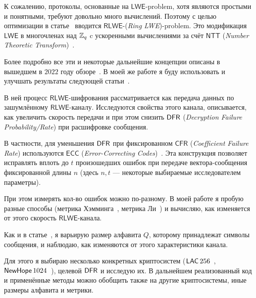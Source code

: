 К сожалению, протоколы, основанные на $\mathsf{LWE}$-problem, хотя являются простыми и понятными, требуют довольно много вычислений. Поэтому с целью оптимизации в статье~\cite{RLWE} вводится $\mathsf{RLWE}$-({\it Ring LWE})-problem. Это модификация $\mathsf{LWE}$ в многочленах над $\mathbb{Z}_q$ c ускоренными вычислениями за счёт $\mathsf{NTT}$ ({\it Number Theoretic Transform})~\cite{NTT_applications}.

Более подробно все эти и некоторые дальнейшие концепции описаны в вышедшем в $2022$ году обзоре~\cite{Li2022ATI}. В моей же работе я буду использовать и улучшать результаты следующей статьи~\cite{RLWE_Channel}.

В ней процесс $\mathsf{RLWE}$-шифрования рассматривается как передача данных по зашумлённому $\mathsf{RLWE}$-каналу. Исследуются свойства этого канала, описывается, как увеличить скорость передачи и при этом снизить $\mathsf{DFR}$ ({\it Decryption Failure Probability/Rate}) при расшифровке сообщения.

В частности, для уменьшения $\mathsf{DFR}$ при фиксированном $\mathsf{CFR}$ ({\it Coefficient Failure Rate}) используются $\mathsf{ECC}$ ({\it Error-Correcting Codes})~\cite{Hamming}. Эта конструкция позволяет исправлять вплоть до $t$ произошедших ошибок при передаче вектора-сообщения фиксированной длины $n$ (здесь $n, t$ --- некоторые выбираемые исследователем параметры).

При этом измерять кол-во ошибок можно по-разному. В моей работе я пробую разные способы (метрика Хэмминга~\cite{Hamming}, метрика Ли~\cite{Lee}) и вычисляю, как изменяется от этого скорость $\mathsf{RLWE}$-канала.

Как и в статье~\cite{RLWE_Channel}, я варьирую размер алфавита $Q$, которому принадлежат символы сообщения, и наблюдаю, как изменяются от этого характеристики канала.

Для этого я выбираю несколько конкретных криптосистем ($\mathsf{LAC}\,256$~\cite{LAC256}, $\mathsf{NewHope}\,1024$~\cite{NewHope1024}), целевой $\mathsf{DFR}$ и исследую их. В дальнейшем реализованный код и применённые методы можно обобщить также на другие криптосистемы, иные размеры алфавита и метрики.

